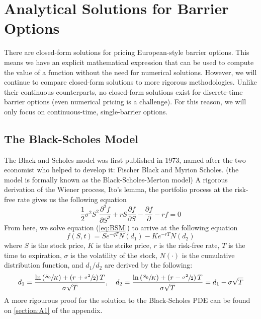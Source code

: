 %
\chapter{Analytical Solutions for Barrier Options}

There are closed-form solutions for pricing European-style barrier options. This means we have an explicit mathematical expression that can be used to compute the value of a function without the need for numerical solutions. However, we will continue to compare closed-form solutions to more rigorous methodologies. Unlike their continuous counterparts, no closed-form solutions exist for discrete-time barrier options (even numerical pricing is a challenge). For this reason, we will only focus on continuous-time, single-barrier options.

\section{The Black-Scholes Model}

The Black and Scholes model was first published in 1973, named after the two economist who helped to develop it: Fischer Black and Myrion Scholes. (the model is formally known as the Black-Scholes-Merton model) A rigorous derivation of the Wiener process, Ito's lemma, the portfolio process at the risk-free rate gives us the following equation
\begin{equation}\label{eq:BSM}
	\frac{1}{2}\sigma^2S^2\frac{\partial^2 f}{\partial S^2}+rS\frac{\partial f}{\partial S}-\frac{\partial f}{\partial }-rf=0
\end{equation}
From here, we solve equation (\ref{eq:BSM}) to arrive at the following equation
\begin{equation}\label{eq:bs_call_option}
	f(S,t)=Se^{-qT}N(d_1)-Ke^{-rT}N(d_2)
\end{equation}
where $S$ is the stock price, $K$ is the strike price, $r$ is the risk-free rate, $T$ is the time to expiration, $\sigma$ is the volatility of the stock, $N(\cdot)$ is the cumulative distribution function, and $d_1/d_2$ are derived by the following:
\begin{equation}
	d_1=\frac{\ln\left(\sfrac{S_0}{K}\right)+\left(r+\sfrac{\sigma^2}{2}\right)T}{\sigma\sqrt{T}},\quad d_2=\frac{\ln\left(\sfrac{S_0}{K}\right)+\left(r-\sfrac{\sigma^2}{2}\right)T}{\sigma\sqrt{T}}=d_1-\sigma\sqrt{T}
\end{equation}
A more rigourous proof for the solution to the Black-Scholes PDE can be found on \ref{section:A1} of the appendix.
